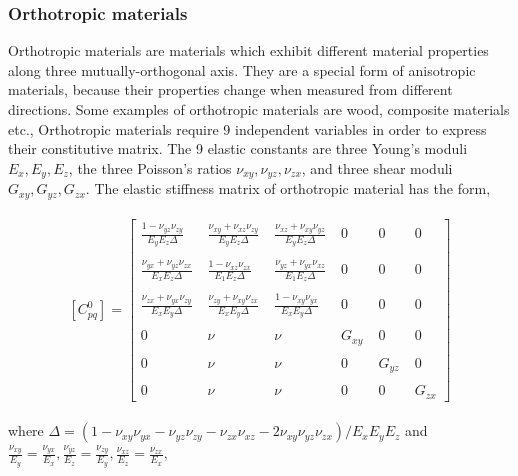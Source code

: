 \documentclass[a4paper,12pt]{extarticle}
\begin{document}
\subsubsection{Orthotropic materials}
\indent\indent\indent Orthotropic materials are materials which exhibit different material properties along three mutually-orthogonal axis. They are a special form of anisotropic materials, because their properties change when measured from different directions. Some examples of orthotropic materials are wood, composite materials etc., Orthotropic materials require 9 independent variables in order to express their constitutive matrix. The 9 elastic constants are three Young's moduli $E_{x},E_{y},E_{z}$, the three Poisson's ratios $\nu_{xy},\nu_{yz},\nu_{zx}$, and three shear moduli $G_{xy},G_{yz},G_{zx}$. The elastic stiffness matrix of orthotropic material has the form,
\\
\\
$$
[C^{0}_{pq}] =  
 \begin{bmatrix}
  \frac{1 - \nu_{yz}\nu_{zy}}{E_{y}E_{z}\Delta} \;& \frac{\nu_{xy} + \nu_{xz}\nu_{zy}}{E_{y}E_{z}\Delta}  \;& \frac{\nu_{xz} + \nu_{xy}\nu_{yz}}{E_{y}E_{z}\Delta}  \;& 0 \;& 0 \;& 0 \\
 \\
   \frac{\nu_{yx} + \nu_{yz}\nu_{zx}}{E_{x}E_{z}\Delta}  \;&  \frac{1 - \nu_{xz}\nu_{zx}}{E_{1}E_{z}\Delta} \; & \frac{\nu_{yz} +\nu_{yx}\nu_{xz}}{E_{1}E_{z}\Delta}  \; & 0\; & 0\; & 0 \\
  \\
    \frac{\nu_{zx} + \nu_{yx}\nu_{zy}}{E_{x}E_{y}\Delta}  \;&   \frac{\nu_{zy} + \nu_{xy}\nu_{zx}}{E_{x}E_{y}\Delta} \;& \frac{1 - \nu_{xy}\nu_{yx}}{E_{x}E_{y}\Delta}  \;& 0 \;& 0 \;& 0 \\ 
\\

 
  0 \;& \nu \;& \nu \;& G_{xy} \;& 0 \;& 0 \\
  \\
  0 \;& \nu \;& \nu \;& 0 \;& G_{yz} \;& 0 \\
  \\
  0\;& \nu \;& \nu \;& 0 \;& 0 \;& G_{zx} 
 \end{bmatrix}
 $$\\
 
 where $\Delta = (1 - \nu_{xy}\nu_{yx} - \nu_{yz}\nu_{zy} - \nu_{zx}\nu_{xz} - 2\nu_{xy}\nu_{yz}\nu_{zx})/E_{x}E_{y}E_{z}$ and 
  $ \frac{\nu_{xy}}{E_{y}} = \frac{\nu_{yx}}{E_{x}}, \frac{\nu_{yz}}{E_{z}} = \frac{\nu_{zy}}{E_{y}}, \frac{\nu_{xz}}{E_{z}} = \frac{\nu_{zx}}{E_{x}},  $
\end{document}
